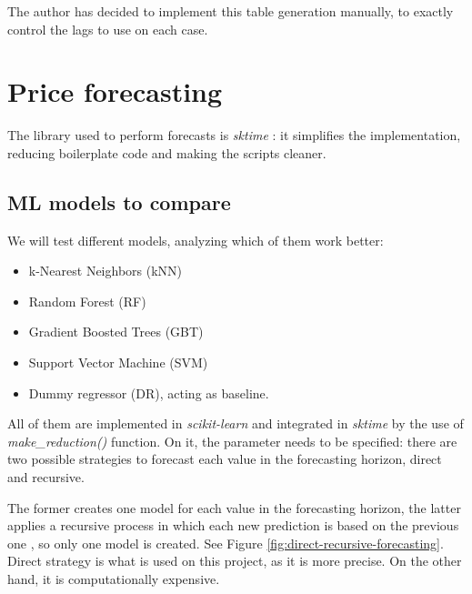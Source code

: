 The author has decided to implement this table generation manually, to exactly control the lags to use on each case.

\section{Price forecasting}
The library used to perform forecasts is \textit{sktime} \cite{DBLP:journals/corr/abs-1909-07872}: it simplifies the implementation, reducing boilerplate code and making the scripts cleaner.

\subsection{ML models to compare}
We will test different models, analyzing which of them work better:
\begin{itemize}
    \item k-Nearest Neighbors (kNN)
    \item Random Forest (RF)
    \item Gradient Boosted Trees (GBT)
    \item Support Vector Machine (SVM)
    \item Dummy regressor (DR), acting as baseline.
\end{itemize}
All of them are implemented in \textit{scikit-learn} and integrated in \textit{sktime} by the use of \textit{make\_reduction()} function. On it, the parameter  needs to be specified: there are two possible strategies to forecast each value in the forecasting horizon, direct and recursive.

The former creates one model for each value in the forecasting horizon, the latter applies a recursive process in which each new prediction is based on the previous one \cite{direct-recursive-forecasting}, so only one model is created. See Figure \ref{fig:direct-recursive-forecasting}. Direct strategy is what is used on this project, as it is more precise. On the other hand, it is computationally expensive.

